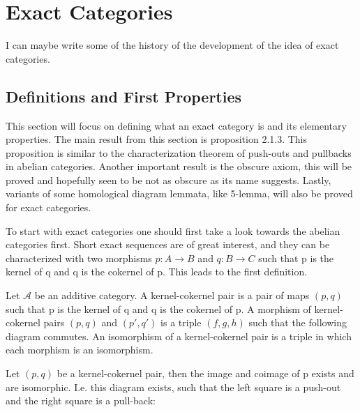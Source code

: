 \chapter{Exact Categories}
            
I can maybe write some of the history of the development of the idea of exact categories. 

\section{Definitions and First Properties}

    This section will focus on defining what an exact category is and its elementary properties. The main result from this section is proposition 2.1.3. This proposition is similar to the characterization theorem of push-outs and pullbacks in abelian categories. Another important result is the obscure axiom, this will be proved and hopefully seen to be not as obscure as its name suggests. Lastly, variants of some homological diagram lemmata, like 5-lemma, will also be proved for exact categories.

    To start with exact categories one should first take a look towards the abelian categories first. Short exact sequences are of great interest, and they can be characterized with two morphisms $p:A\rightarrow B$ and $q:B\rightarrow C$ such that p is the kernel of q and q is the cokernel of p. This leads to the first definition.

    \begin{definition}
        Let $\mathcal{A}$ be an additive category. A kernel-cokernel pair is a pair of maps $(p,q)$ such that p is the kernel of q and q is the cokernel of p. A morphism of kernel-cokernel pairs $(p,q)$ and $(p',q')$ is a triple $(f,g,h)$ such that the following diagram commutes. An isomorphism of a kernel-cokernel pair is a triple in which each morphism is an isomorphism.
        \begin{center}
        \end{center}
    \end{definition}

    \begin{lemma}
        Let $(p,q)$ be a kernel-cokernel pair, then the image and coimage of p exists and are isomorphic. I.e. this diagram exists, such that the left square is a push-out and the right square is a pull-back:
        \begin{center}
        \end{center}
    \end{lemma}
    
